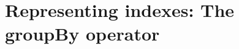 \documentclass[preprint,authoryear,10pt]{sigplanconf}
\begin{document}
%
%
%
%

\section{Representing indexes: The groupBy operator}
\end{document}
